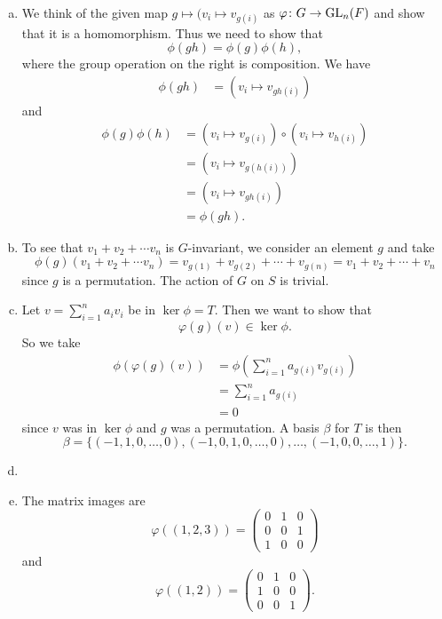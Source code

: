 \documentclass[leqno]{article}
\begin{document}
\begin{solution}~
\begin{enumerate}[(a)]
    \item We think of the given map $g\mapsto (v_i\mapsto v_{g(i)}$ as $\varphi \colon G \to \mathrm{GL}_n(F)$ and show that it is a homomorphism. Thus we need to show that
    \[
    \phi(gh)=\phi(g)\phi(h),
    \]
    where the group operation on the right is composition. We have
    \begin{align*}
        \phi(gh)&= (v_i\mapsto v_{gh(i)})
    \end{align*}
    and
    \begin{align*}
        \phi(g)\phi(h)&= (v_i \mapsto v_{g(i)})\circ (v_i \mapsto v_{h(i)})\\
        &= (v_i \mapsto v_{g(h(i))})\\
        &= (v_i \mapsto v_{gh(i)})\\
        &= \phi(gh).
    \end{align*}
    \item To see that $v_1+ v_2 + \cdots v_n$ is $G$-invariant, we consider an element $g$ and take
    \[
    \phi(g)(v_1+v_2 + \cdots v_n)=v_{g(1)}+v_{g(2)}+\cdots + v_{g(n)}=v_1+v_2 +\cdots + v_n
    \]
    since $g$ is a permutation. The action of $G$ on $S$ is trivial.
    \item Let $v=\sum_{i=1}^n a_i v_i$ be in $\ker\phi=T$.  Then we want to show that
    \[
    \varphi(g)(v) \in \ker\phi.
    \]
    So we take
    \begin{align*}
    \phi(\varphi(g)(v)) &= \phi\left( \sum_{i=1}^n a_{g(i)} v_{g(i)}\right)\\
    &= \sum_{i=1}^n a_{g(i)}\\
    &=0
    \end{align*}
    since $v$ was in $\ker\phi$ and $g$ was a permutation. A basis $\beta$ for $T$ is then
    \[
    \beta = \{ (-1,1,0,\dots,0), (-1,0,1,0,\dots,0), \dots, (-1,0,0,\dots,1)\}.
    \]
    \item 
    
    \item The matrix images are
    \[
    \varphi((1,2,3))= \begin{pmatrix} 0 & 1 & 0 \\ 0 & 0 & 1\\ 1 & 0 & 0 \end{pmatrix}
    \]
    and
    \[
    \varphi((1,2))= \begin{pmatrix} 0 & 1 & 0 \\ 1 & 0 & 0 \\ 0 & 0 & 1 \end{pmatrix}.
    \]
\end{enumerate}
\end{solution}
\end{document}
